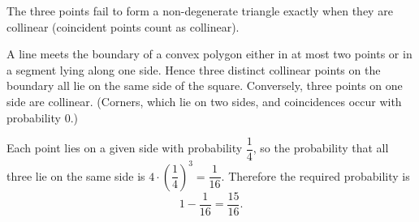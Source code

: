 The three points fail to form a non-degenerate triangle exactly when they are collinear (coincident points count as collinear).

A line meets the boundary of a convex polygon either in at most two points or in a segment lying along one side. Hence three distinct collinear points on the boundary all lie on the same side of the square. Conversely, three points on one side are collinear. (Corners, which lie on two sides, and coincidences occur with probability $0$.)

Each point lies on a given side with probability $\dfrac{1}{4}$, so the probability that all three lie on the same side is $4\cdot\left(\dfrac{1}{4}\right)^3=\dfrac{1}{16}$. Therefore the required probability is
\[1-\dfrac{1}{16}=\boxed{\dfrac{15}{16}}.\]
